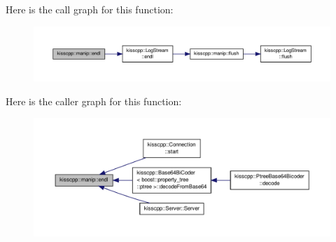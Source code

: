 Here is the call graph for this function\-:\nopagebreak
\begin{figure}[H]
\begin{center}
\leavevmode
\includegraphics[width=350pt]{namespacekisscpp_1_1manip_ad682f16cb474bc7ff2c991ad2c45db66_cgraph}
\end{center}
\end{figure}




Here is the caller graph for this function\-:\nopagebreak
\begin{figure}[H]
\begin{center}
\leavevmode
\includegraphics[width=350pt]{namespacekisscpp_1_1manip_ad682f16cb474bc7ff2c991ad2c45db66_icgraph}
\end{center}
\end{figure}


